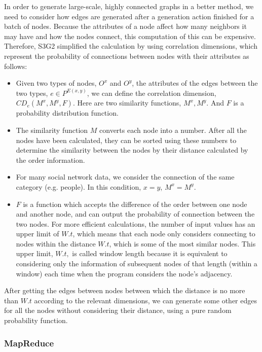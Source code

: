 \begin{survey}
In order to generate large-scale, highly connected graphs in a better
method, we need to consider how edges are generated after a generation
action finished for a batch of nodes. Because the attributes of a node
affect how many neighbors it may have and how the nodes connect, this
computation of this can be expensive. Therefore, S3G2 simplified the
calculation by using correlation dimensions, which represent the
probability of connections between nodes with their attributes as
follows:

\begin{itemize}
\item
  Given two types of nodes, \(O^x\) and \(O^y\), the attributes of the
  edges between the two types, \(e\in P^{E(x, y)}\), we can define the
  correlation dimension, \(CD_e(M^x, M^y, F)\). Here are two similarity
  functions, \(M^x, M^y\). And \(F\) is a probability distribution
  function.
\item
  The similarity function \(M\) converts each node into a number. After
  all the nodes have been calculated, they can be sorted using these
  numbers to determine the similarity between the nodes by their
  distance calculated by the order information.
\item
  For many social network data, we consider the connection of the same
  category (e.g. people). In this condition, \(x=y\), \(M^x=M^y\).
\item
  \(F\) is a function which accepts the difference of the order between
  one node and another node, and can output the probability of
  connection between the two nodes. For more efficient calculations, the
  number of input values has an upper limit of \(W.t\), which means that
  each node only considers connecting to nodes within the distance
  \(W.t\), which is some of the most similar nodes. This upper limit,
  \(W.t, \) is called window length because it is equivalent to
  considering only the information of subsequent nodes of that length
  (within a window) each time when the program considers the node's
  adjacency.
\end{itemize}

\vspace{0.2cm}

After getting the edges between nodes between which the distance is no
more than \(W.t\) according to the relevant dimensions, we can generate
some other edges for all the nodes without considering their distance,
using a pure random probability function.

\subsubsection{MapReduce}


\end{survey}
